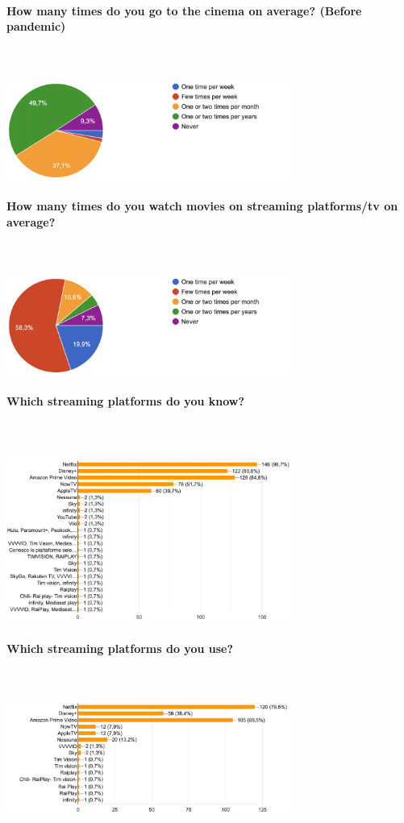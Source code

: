 \documentclass[12pt, a4paper]{article}
\begin{document}
\paragraph{How many times do you go to the cinema on average? (Before pandemic)}\mbox{}\\\\
\includegraphics[width=0.7\textwidth]{Images/timeAtCinema.png}

\paragraph{How many times do you watch movies on streaming platforms/tv on average?}\mbox{}\\\\
\includegraphics[width=0.7\textwidth]{Images/timeStreaming.png}

\paragraph{Which streaming platforms do you know?}\mbox{}\\\\
\includegraphics[width=0.7\textwidth]{Images/streamingPlatform.png}\\

\paragraph{Which streaming platforms do you use?}\mbox{}\\\\
\includegraphics[width=0.7\textwidth]{Images/streamingPlatformUsed.png}
\end{document}
